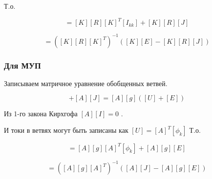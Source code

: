 Т.о. 

\begin{equation}
[K][E] = [K][R][K]^T[I_{kk}]+[K][R][J]
\end{equation}

\begin{equation}
[I_{kk}] = ([K][R][K]^T )^{-1} ([K][E] - [K][R][J])
\end{equation}


\subsubsection{Для МУП}


Записываем матричное уравнение обобщенных ветвей.


\begin{equation}
[A][I]+[A][J]=[A][g] ([U]+[E])
\end{equation}

Из 1-го закона Кирхгофа $[A][I]=0$
.


И токи в ветвях могут быть записаны как $[U]=[A]^T[\phi_{k}]$ 
Т.о. 

\begin{equation}
[A][J] = [A][g][A]^T[\phi_{k}]+[A][g][E]
\end{equation}

\begin{equation}
[\phi_{k}] = ([A][g][A]^T )^{-1} ([A][J] - [A][g][E])
\end{equation}


\pagebreak